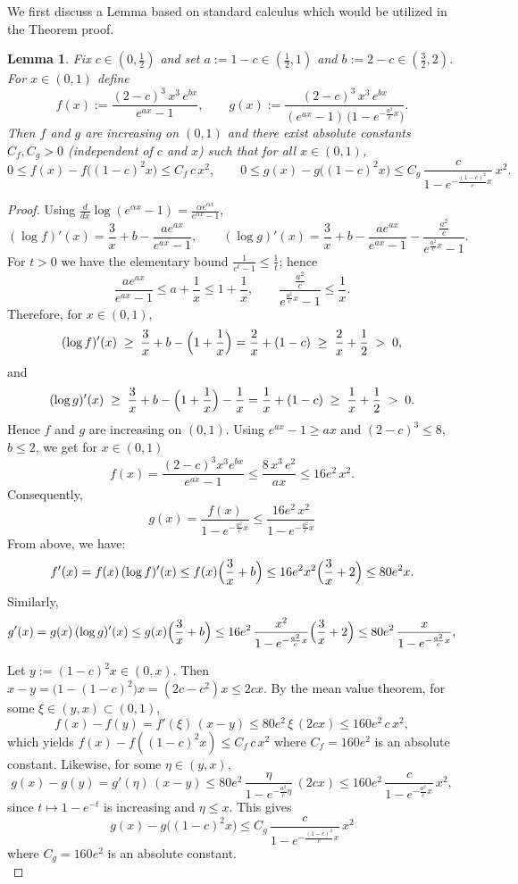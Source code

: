 \documentclass{article}
\newtheorem{lemma}{Lemma}[section]
\begin{document}
\noindent
We first discuss a Lemma based on standard calculus which would be utilized in the Theorem proof.

\begin{lemma}\label{utility_lemma}
Fix $c\in(0,\tfrac12)$ and set $a:=1-c\in(\tfrac12,1)$ and $b:=2-c\in(\tfrac32,2)$. For $x\in(0,1)$ define
\[
f(x):=\frac{(2-c)^3\,x^3\,e^{bx}}{e^{ax}-1}, 
\qquad
g(x):=\frac{(2-c)^3\,x^3\,e^{bx}}{(e^{ax}-1)\,\bigl(1-e^{-\frac{a^2}{c}x}\bigr)}.
\]
Then $f$ and $g$ are increasing on $(0,1)$ and there exist absolute constants $C_f,C_g>0$ (independent of $c$ and $x$) such that for all $x\in(0,1)$,
\[
0\le f(x)-f\!\big((1-c)^2x\big)\le C_f\,c\,x^2,
\qquad
0\le g(x)-g\!\big((1-c)^2x\big)\le C_g\,\frac{c}{1-e^{-\frac{(1-c)^2}{c}x}}\,x^2.
\]
\end{lemma}

\begin{proof}
Using $\frac{d}{dx}\log(e^{\alpha x}-1)=\frac{\alpha e^{\alpha x}}{e^{\alpha x}-1}$,
\[
(\log f)'(x)=\frac{3}{x}+b-\frac{a e^{ax}}{e^{ax}-1}, 
\qquad
(\log g)'(x)=\frac{3}{x}+b-\frac{a e^{ax}}{e^{ax}-1}-\frac{\frac{a^2}{c}}{e^{\frac{a^2}{c}x}-1}.
\]
For $t>0$ we have the elementary bound $\frac{1}{e^{t}-1}\le \frac{1}{t}$; hence
\[
\frac{a e^{ax}}{e^{ax}-1}\le a+\frac1x\le 1+\frac1x, 
\qquad
\frac{\frac{a^2}{c}}{e^{\frac{a^2}{c}x}-1}\le \frac{1}{x}.
\]
Therefore, for $x\in(0,1)$,
\[
(\log f)'(x)\;\ge\;\frac{3}{x}+b-\Bigl(1+\frac1x\Bigr)
= \frac{2}{x}+(1-c)\;\ge\;\frac{2}{x}+\frac12\;>\;0,
\]
and
\[
(\log g)'(x)\;\ge\;\frac{3}{x}+b-\Bigl(1+\frac1x\Bigr)-\frac1x
= \frac{1}{x}+(1-c)\;\ge\;\frac{1}{x}+\frac12\;>\;0.
\]
Hence $f$ and $g$ are increasing on $(0,1)$. Using $e^{ax}-1\ge ax$ and $(2-c)^3\le 8$, $b\le 2$, we get for $x\in(0,1)$
\[
f(x)=\frac{(2-c)^3 x^3 e^{bx}}{e^{ax}-1}
\le \frac{8\,x^3\,e^{2}}{ax}\le 16e^{2}\,x^2.
\]
Consequently,
\[
g(x)=\frac{f(x)}{1-e^{-\frac{a^2}{c}x}}
\le \frac{16e^2\,x^2}{1-e^{-\frac{a^2}{c}x}}
\]
From above, we have:
\[
f'(x)=f(x)\,(\log f)'(x)\le f(x)\Bigl(\frac{3}{x}+b\Bigr)
\le 16e^2 x^2\Bigl(\frac{3}{x}+2\Bigr)
\le 80e^2x.
\]
Similarly,
\[
g'(x)=g(x)\,(\log g)'(x)
\le g(x)\Bigl(\frac{3}{x}+b\Bigr)
\le 16e^2\,\frac{x^2}{1-e^{-\frac{a^2}{c}x}}\Bigl(\frac{3}{x}+2\Bigr)
\le 80e^2\,\frac{x}{1-e^{-\frac{a^2}{c}x}},
\]

\noindent
Let $y:=(1-c)^2x\in(0,x)$. Then $x-y=\bigl(1-(1-c)^2\bigr)x=(2c-c^2)x\le 2cx$.
By the mean value theorem, for some $\xi\in(y,x)\subset(0,1)$,
\[
f(x)-f(y)=f'(\xi)\,(x-y)\le 80e^2\,\xi\,(2cx)\le 160e^2\,c\,x^2,
\]
which yields $f(x)-f((1-c)^2x)\le C_f\,c\,x^2$ where $C_f=160e^2$ is an absolute constant. Likewise, for some $\eta\in(y,x)$,
\[
g(x)-g(y)=g'(\eta)\,(x-y)\le 80e^2\,\frac{\eta}{1-e^{-\frac{a^2}{c}\eta}}\,(2cx)
\le 160e^2\,\frac{c}{1-e^{-\frac{a^2}{c}x}}\,x^2,
\]
since $t\mapsto 1-e^{-t}$ is increasing and $\eta\le x$. This gives
\[
g(x)-g\big((1-c)^2x\big)\le C_g\,\frac{c}{1-e^{-\frac{(1-c)^2}{c}x}}\,x^2
\]
where $C_g=160e^2$ is an absolute constant. \\
\end{proof}
\end{document}
